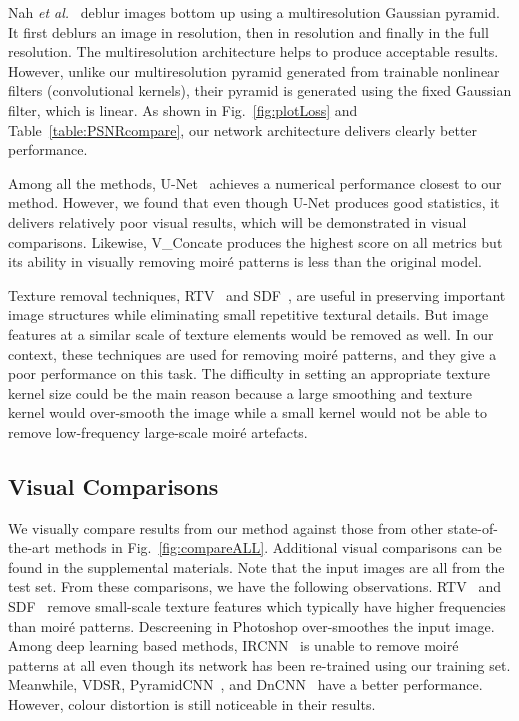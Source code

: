 \documentclass[journal]{IEEEtran}
\providecommand{\shortcite}[1]{\cite{#1}}
\begin{document}
Nah {\em et al.}~\shortcite{nah2016deep} deblur images bottom up using a multiresolution Gaussian pyramid. It first deblurs an image in  resolution, then in  resolution and finally in the full resolution. The multiresolution architecture helps to produce acceptable results. However, unlike our multiresolution pyramid generated from trainable nonlinear filters (convolutional kernels), their pyramid is generated using the fixed Gaussian filter, which is linear. As shown in Fig.~\ref{fig:plotLoss} and Table~\ref{table:PSNRcompare}, our network architecture delivers clearly better performance.

Among all the methods, U-Net~\cite{ronneberger2015u} achieves a numerical performance closest to our method. However, we found that even though U-Net produces good statistics, it delivers relatively poor visual results, which will be demonstrated in visual comparisons. Likewise, V\_Concate produces the highest score on all metrics but its ability in visually removing moir\'{e} patterns is less than the original model.

Texture removal techniques, RTV~\cite{xu2012structure} and SDF~\cite{ham2015}, are useful in preserving important image structures while eliminating small repetitive textural details. But image features at a similar scale of texture elements would be removed as well. In our context, these techniques are used for removing moir\'{e} patterns, and they give a poor performance on this task. The difficulty in setting an appropriate texture kernel size could be the main reason because a large smoothing and texture kernel would over-smooth the image while a small kernel would not be able to remove low-frequency large-scale moir\'{e} artefacts.


\subsection{Visual Comparisons}
We visually compare results from our method against those from other state-of-the-art methods in Fig.~\ref{fig:compareALL}. Additional visual comparisons can be found in the supplemental materials. Note that the input images are all from the test set. From these comparisons, we have the following observations. RTV~\cite{xu2012structure} and SDF~\cite{ham2015} remove small-scale texture features which typically have higher frequencies than moir\'{e} patterns. Descreening in Photoshop over-smoothes the input image. Among deep learning based methods, IRCNN~\cite{zhang2017learning} is unable to remove moir\'{e} patterns at all even though its network has been re-trained using our training set. Meanwhile, VDSR\cite{kim2016accurate}, PyramidCNN~\cite{nah2016deep}, and DnCNN~\cite{zhang2017beyond} have a better performance. However, colour distortion is still noticeable in their results.
\end{document}
